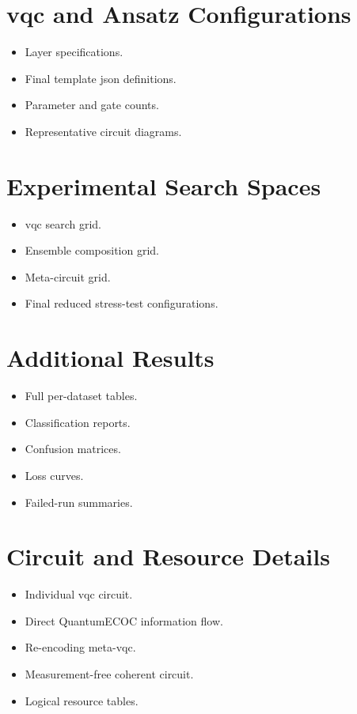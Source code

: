 \documentclass[]{UCD_CS_MSc_AAI_Report}
\begin{document}
\chapter{\acs*{vqc} and Ansatz Configurations}
\label{app:ansatze}
\begin{itemize}
    \item Layer specifications.
    \item Final template \ac{json} definitions.
    \item Parameter and gate counts.
    \item Representative circuit diagrams.
\end{itemize}

\chapter{Experimental Search Spaces}
\label{app:search-spaces}
\begin{itemize}
    \item \ac{vqc} search grid.
    \item Ensemble composition grid.
    \item Meta-circuit grid.
    \item Final reduced stress-test configurations.
\end{itemize}

\chapter{Additional Results}
\label{app:additional-results}
\begin{itemize}
    \item Full per-dataset tables.
    \item Classification reports.
    \item Confusion matrices.
    \item Loss curves.
    \item Failed-run summaries.
\end{itemize}

\chapter{Circuit and Resource Details}
\label{app:circuits}
\begin{itemize}
    \item Individual \ac{vqc} circuit.
    \item Direct QuantumECOC information flow.
    \item Re-encoding meta-\ac{vqc}\@.
    \item Measurement-free coherent circuit.
    \item Logical resource tables.
\end{itemize}
\end{document}
